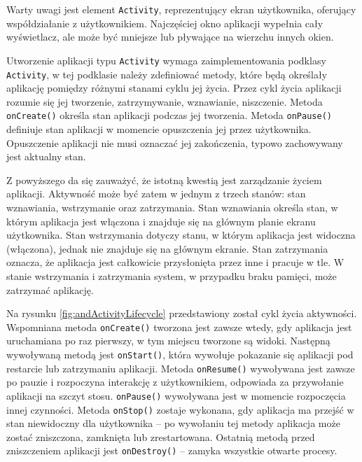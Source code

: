 \documentclass[eng,printmode,oneside]{mgr}
\begin{document}
Warty uwagi jest element \texttt{Activity}, reprezentujący ekran użytkownika,
oferujący współdziałanie z użytkownikiem. Najczęściej okno aplikacji wypełnia
cały wyświetlacz, ale może być mniejsze lub pływające na wierzchu innych okien.

Utworzenie aplikacji typu \texttt{Activity} wymaga zaimplementowania podklasy
\texttt{Activity}, w tej podklasie należy zdefiniować metody, które będą
określały aplikację pomiędzy różnymi stanami cyklu jej życia. Przez cykl życia
aplikacji rozumie się jej tworzenie, zatrzymywanie, wznawianie, niszczenie.
Metoda \texttt{onCreate()} określa stan aplikacji podczas jej tworzenia. Metoda
\texttt{onPause()} definiuje stan aplikacji w momencie opuszczenia jej przez
użytkownika. Opuszczenie aplikacji nie musi oznaczać jej zakończenia, typowo
zachowywany jest aktualny stan.

Z powyższego da się zauważyć, że istotną kwestią jest zarządzanie życiem
aplikacji. Aktywność może być zatem w jednym z trzech stanów: stan wznawiania,
wstrzymanie oraz zatrzymania. Stan wznawiania określa stan, w którym aplikacja
jest włączona i znajduje się na głównym planie ekranu użytkownika. Stan
wstrzymania dotyczy stanu, w którym aplikacja jest widoczna (włączona), jednak
nie znajduje się na głównym ekranie. Stan zatrzymania oznacza, że aplikacja jest
całkowicie przysłonięta przez inne i pracuje w tle. W stanie wstrzymania i
zatrzymania system, w przypadku braku pamięci, może zatrzymać aplikację.

Na rysunku \ref{fig:andActivityLifecycle} przedstawiony został cykl życia
aktywności. Wspomniana metoda \texttt{onCreate()} tworzona jest zawsze wtedy,
gdy aplikacja jest uruchamiana po raz pierwszy, w tym miejscu tworzone są widoki.
Następną wywoływaną metodą jest \texttt{onStart()}, która wywołuje pokazanie się
aplikacji pod restarcie lub zatrzymaniu aplikacji. Metoda \texttt{onResume()} wywoływana jest
zawsze po pauzie i rozpoczyna interakcję z użytkownikiem, odpowiada za
przywołanie aplikacji na szczyt stosu. \texttt{onPause()} wywoływana jest w
momencie rozpoczęcia innej czynności. Metoda \texttt{onStop()} zostaje
wykonana, gdy aplikacja ma przejść w stan niewidoczny dla użytkownika -- po
wywołaniu tej metody aplikacja może zostać zniszczona, zamknięta lub zrestartowana.
Ostatnią metodą przed zniszczeniem aplikacji jest \texttt{onDestroy()} -- zamyka
wszystkie otwarte procesy.
\end{document}
